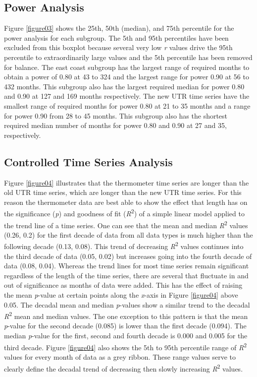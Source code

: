 \documentclass{ametsoc}
\begin{document}
\subsection{Power Analysis}
Figure \ref{figure03} shows the 25th, 50th (median), and 75th percentile for the power analysis for each subgroup. The 5th and 95th percentiles have been excluded from this boxplot because several very low \emph{r} values drive the 95th percentile to extraordinarily large values and the 5th percentile has been removed for balance. The east coast subgroup has the largest range of required months to obtain a power of 0.80 at 43 to 324 and the largest range for power 0.90 at 56 to 432 months. This subgroup also has the largest required median for power 0.80 and 0.90 at 127 and 169 months respectively. The new UTR time series have the smallest range of required months for power 0.80 at 21 to 35 months and a range for power 0.90 from 28 to 45 months. This subgroup also has the shortest required median number of months for power 0.80 and 0.90 at 27 and 35, respectively.

\subsection{Controlled Time Series Analysis}
Figure \ref{figure04} illustrates that the thermometer time series are longer than the old UTR time series, which are longer than the new UTR time series. For this reason the thermometer data are best able to show the effect that length has on the significance (\emph{p}) and goodness of fit (\emph{R}\textsuperscript{2}) of a simple linear model applied to the trend line of a time series. One can see that the mean and median \emph{R}\textsuperscript{2} values (0.26, 0.2) for the first decade of data from all data types is much higher than the following decade (0.13, 0.08). This trend of decreasing \emph{R}\textsuperscript{2} values continues into the third decade of data (0.05, 0.02) but increases going into the fourth decade of data (0.08, 0.04). Whereas the trend lines for most time series remain significant regardless of the length of the time series, there are several that fluctuate in and out of significance as months of data were added. This has the effect of raising the mean \emph{p}-value at certain points along the \emph{x}-axis in Figure \ref{figure04} above 0.05. The decadal mean and median \emph{p}-values show a similar trend to the decadal \emph{R}\textsuperscript{2} mean and median values. The one exception to this pattern is that the mean \emph{p}-value for the second decade (0.085) is lower than the first decade (0.094). The median \emph{p}-value for the first, second and fourth decade is 0.000 and 0.005 for the third decade. Figure \ref{figure04} also shows the 5th to 95th percentile range of \emph{R}\textsuperscript{2} values for every month of data as a grey ribbon. These range values serve to clearly define the decadal trend of decreasing then slowly increasing \emph{R}\textsuperscript{2} values.
\end{document}
